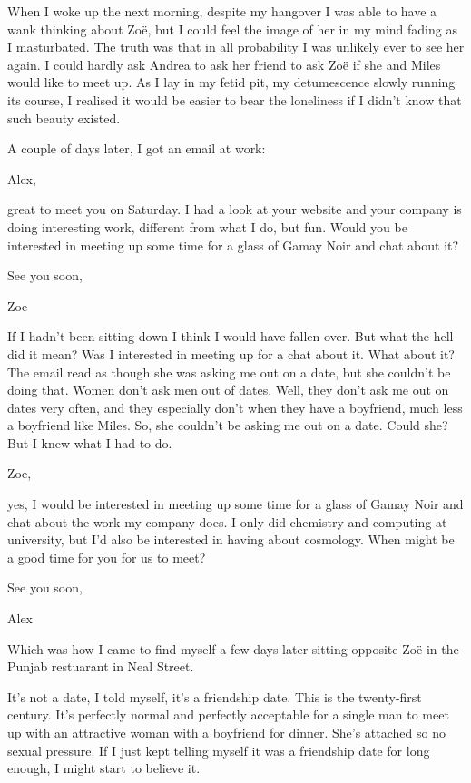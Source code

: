 When I woke up the next morning, despite my hangover I was able to
have a wank thinking about Zoë, but I could feel the image of
her in my mind fading as I masturbated. The truth was that in all probability I was
unlikely ever to see her again. I could hardly ask Andrea to ask her
friend to ask Zoë if she and Miles would like to meet up. As I lay in my fetid pit, my detumescence
slowly running its course, I realised it
would be easier to bear the loneliness if I didn't know that such
beauty existed.

A couple of days later, I got an email at work:

{\twelvett Alex,

great to meet you on Saturday. I had a look at your website and your
company is doing interesting work, different from what I do, but
fun. Would you be interested in meeting up some time for a glass of
Gamay Noir and chat about it?

See you soon,

Zoe}

If I hadn't been sitting down I think I would have fallen over. But
what the hell did it mean? Was I interested in meeting up for a chat
about it. What about it? The email read as though she was asking me
out on a date, but she couldn't be doing that. Women don't ask men
out of dates. Well, they don't ask me out on dates very often, and
they especially don't when they have a boyfriend, much less a
boyfriend like Miles. So, she couldn't be asking me out on a date.
Could she? But I knew what I had to do.

{\twelvett Zoe,

yes, I would be interested in meeting up some time for a glass of
Gamay Noir and chat about the work my company does. I only did
chemistry and computing at university, but I'd also be interested in
having about cosmology. When might be a good time for you for us to
meet?

See you soon,

Alex}

Which was how I came to find myself a few days later sitting
opposite Zoë in the Punjab restuarant in Neal Street.

It's not a {\twelveit date\/}, I told myself, it's a {\twelveit
friendship\/} date. This is the twenty-first century. It's perfectly
normal and perfectly acceptable for a single man to meet up with an
attractive woman with a boyfriend for dinner. She's attached so no
sexual pressure. If I just kept telling myself it was a friendship
date for long enough, I might start to believe it.

